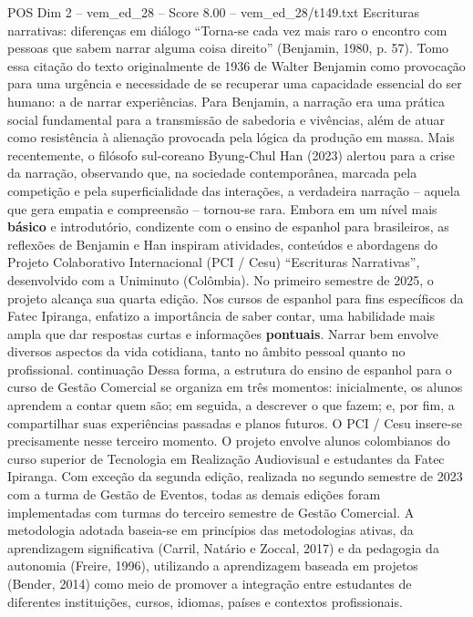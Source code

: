 \begin{textsample}{POS Dim 2 – vem\_ed\_28 – Score 8.00 – vem\_ed\_28/t149.txt}  \label{ex:f2_pos_076}
Escrituras narrativas: diferenças em diálogo “Torna-se cada vez mais raro o encontro com pessoas que sabem narrar alguma coisa direito” (Benjamin, 1980, p. 57).
Tomo essa citação do texto originalmente de 1936 de Walter Benjamin como provocação para uma urgência e necessidade de se recuperar uma capacidade essencial do ser humano: a de narrar experiências.
Para Benjamin, a narração era uma prática social fundamental para a transmissão de sabedoria e vivências, além de atuar como resistência à alienação provocada pela lógica da produção em massa.
Mais recentemente, o filósofo sul-coreano Byung-Chul Han (2023) alertou para a crise da narração, observando que, na sociedade contemporânea, marcada pela competição e pela superficialidade das interações, a verdadeira narração – aquela que gera empatia e compreensão – tornou-se rara.
Embora em um nível mais \textbf{básico} e introdutório, condizente com o ensino de espanhol para brasileiros, as reflexões de Benjamin e Han inspiram atividades, conteúdos e abordagens do Projeto Colaborativo Internacional (PCI / Cesu) “Escrituras Narrativas”, desenvolvido com a Uniminuto (Colômbia).
No primeiro semestre de 2025, o projeto alcança sua quarta edição.
Nos cursos de espanhol para fins específicos da Fatec Ipiranga, enfatizo a importância de saber contar, uma habilidade mais ampla que dar respostas curtas e informações \textbf{pontuais}.
Narrar bem envolve diversos aspectos da vida cotidiana, tanto no âmbito pessoal quanto no profissional. continuação Dessa forma, a estrutura do ensino de espanhol para o curso de Gestão Comercial se organiza em três momentos: inicialmente, os alunos aprendem a contar quem são; em seguida, a descrever o que fazem; e, por fim, a compartilhar suas experiências passadas e planos futuros.
O PCI / Cesu insere-se precisamente nesse terceiro momento.
O projeto envolve alunos colombianos do curso superior de Tecnologia em Realização Audiovisual e estudantes da Fatec Ipiranga.
Com exceção da segunda edição, realizada no segundo semestre de 2023 com a turma de Gestão de Eventos, todas as demais edições foram implementadas com turmas do terceiro semestre de Gestão Comercial.
A metodologia adotada baseia-se em princípios das metodologias ativas, da aprendizagem significativa (Carril, Natário e Zoccal, 2017) e da pedagogia da autonomia (Freire, 1996), utilizando a aprendizagem baseada em projetos (Bender, 2014) como meio de promover a integração entre estudantes de diferentes instituições, cursos, idiomas, países e contextos profissionais.

\end{textsample}
